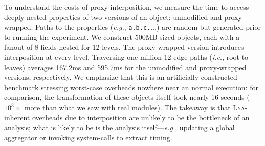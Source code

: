 \documentclass[letterpaper,twocolumn,10pt]{article}
\def\eg{{\em e.g.}, }
\def\ie{{\em i.e.}, }
\newcommand{\ttt}[1]{\texttt{#1}}
\newcommand{\sys}{{\scshape Lya}\xspace}
\begin{document}
To understand the costs of proxy interposition, we measure the time to access deeply-nested properties of two versions of an object:
  unmodified and proxy-wrapped.
Paths to the properties (\eg \ttt{a.b.c.$\ldots$}) are random but generated prior to running the experiment.
We construct 500MB-sized objects, each with a fanout of 8 fields nested for 12 levels.
The proxy-wrapped version introduces interposition at every level.
Traversing one million 12-edge paths (\ie root to leaves) averages 167.2ms and 595.7ms for the unmodified and proxy-wrapped versions, respectively.
% 
We emphasize that this is an artificially constructed benchmark stressing worst-case overheads nowhere near an normal execution:
  for comparison, the transformation of these objects itself took nearly 16 seconds ($10^3\times$ more than what we saw with real modules).
The takeaway is that \sys-inherent overheads due to interposition are unlikely to be the bottleneck of an analysis;
  what is likely to be is the analysis itself---\eg updating a global aggregator or invoking system-calls to extract timing.
\end{document}
